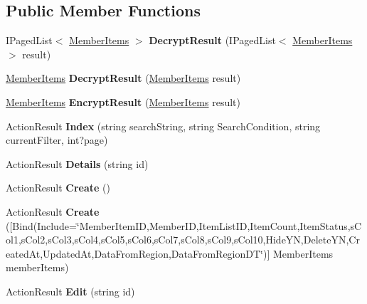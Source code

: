 \subsection*{Public Member Functions}
\begin{DoxyCompactItemize}
\item 
I\+Paged\+List$<$ \hyperlink{a00143}{Member\+Items} $>$ {\bfseries Decrypt\+Result} (I\+Paged\+List$<$ \hyperlink{a00143}{Member\+Items} $>$ result)\hypertarget{a00194_ae8b527d95b2dcb97a305f574517d2947}{}\label{a00194_ae8b527d95b2dcb97a305f574517d2947}

\item 
\hyperlink{a00143}{Member\+Items} {\bfseries Decrypt\+Result} (\hyperlink{a00143}{Member\+Items} result)\hypertarget{a00194_a17160bc80e3e08a5253435215d7926f7}{}\label{a00194_a17160bc80e3e08a5253435215d7926f7}

\item 
\hyperlink{a00143}{Member\+Items} {\bfseries Encrypt\+Result} (\hyperlink{a00143}{Member\+Items} result)\hypertarget{a00194_ac500198a4eb761c52b817497df717395}{}\label{a00194_ac500198a4eb761c52b817497df717395}

\item 
Action\+Result {\bfseries Index} (string search\+String, string Search\+Condition, string current\+Filter, int?page)\hypertarget{a00194_affdc71723cb80c4d3ba78a5e806a91d2}{}\label{a00194_affdc71723cb80c4d3ba78a5e806a91d2}

\item 
Action\+Result {\bfseries Details} (string id)\hypertarget{a00194_a71a5ae8dad765ccfe9e52d3344e43baf}{}\label{a00194_a71a5ae8dad765ccfe9e52d3344e43baf}

\item 
Action\+Result {\bfseries Create} ()\hypertarget{a00194_a5a81f0e7f646fc730103206f03514f20}{}\label{a00194_a5a81f0e7f646fc730103206f03514f20}

\item 
Action\+Result {\bfseries Create} (\mbox{[}Bind(Include=\char`\"{}Member\+Item\+ID,Member\+ID,Item\+List\+ID,Item\+Count,Item\+Status,s\+Col1,s\+Col2,s\+Col3,s\+Col4,s\+Col5,s\+Col6,s\+Col7,s\+Col8,s\+Col9,s\+Col10,Hide\+YN,Delete\+YN,Created\+At,Updated\+At,Data\+From\+Region,Data\+From\+Region\+DT\char`\"{})\mbox{]} Member\+Items member\+Items)\hypertarget{a00194_ad37e8a5086944acb6e6060daf77aaad0}{}\label{a00194_ad37e8a5086944acb6e6060daf77aaad0}

\item 
Action\+Result {\bfseries Edit} (string id)\hypertarget{a00194_a262b75b71297635b4edbb0e2cfd355cb}{}\label{a00194_a262b75b71297635b4edbb0e2cfd355cb}


\end{DoxyCompactItemize}
